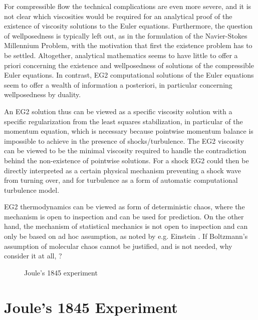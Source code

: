 For compressible flow the technical complications are even more
severe, and it is not clear which viscosities would be required for an
analytical proof of the existence of viscosity solutions
\cite{feireisl} to the Euler equations.  Furthermore, the question of
wellposedness is typically left out, as in the formulation of the
Navier-Stokes Millennium Problem, with the motivation that first the
existence problem has to be settled.  Altogether, analytical
mathematics seems to have little to offer a priori concerning the
existence and wellposedness of solutions of the compressible Euler
equations.  In contrast, EG2 computational solutions of the Euler
equations seem to offer a wealth of information a posteriori, in
particular concerning wellposedness by duality.

An EG2 solution thus can be viewed as a specific viscosity solution
with a specific regularization from the least squares stabilization,
in particular of the momentum equation, which is necessary because
pointwise momentum balance is impossible to achieve in the presence of
shocks/turbulence.  The EG2 viscosity can be viewed to be the minimal
viscosity required to handle the contradiction behind the
non-existence of pointwise solutions.  For a shock EG2 could then be
directly interpreted as a certain physical mechanism preventing a
shock wave from turning over, and for turbulence as a form of
automatic computational turbulence model.

EG2 thermodynamics can be viewed as form of deterministic chaos, where
the mechanism is open to inspection and can be used for prediction. On
the other hand, the mechanism of statistical mechanics is not open to
inspection and can only be based on ad hoc assumption, as noted by
e.g. Einstein \cite{einsteincit1}. If Boltzmann's assumption of
molecular chaos cannot be justified, and is not needed, why consider
it at all, \cite{loschmidt}?

\begin{figure}[bhpt] 
\centerline{ 
} 
\caption{Joule's 1845 experiment}
\label{joule} 
\end{figure} 


\section{Joule's 1845 Experiment} 

